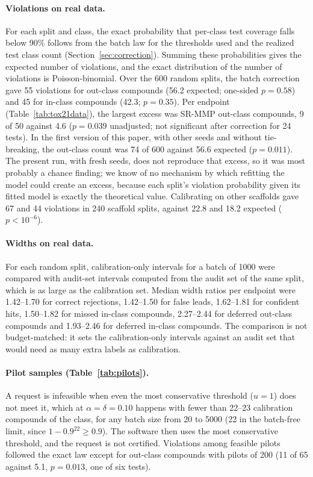 \documentclass[10pt]{article}
\begin{document}
\paragraph{Violations on real data.} For each split and class, the exact probability that per-class test coverage falls below 90\% follows from the batch law for the thresholds used and the realized test class count (Section~\ref{sec:correction}). Summing these probabilities gives the expected number of violations, and the exact distribution of the number of violations is Poisson-binomial. Over the 600 random splits, the batch correction gave 55 violations for out-class compounds (56.2 expected; one-sided $p=0.58$) and 45 for in-class compounds (42.3; $p=0.35$). Per endpoint (Table~\ref{tab:tox21data}), the largest excess was SR-MMP out-class compounds, 9 of 50 against 4.6 ($p=0.039$ unadjusted; not significant after correction for 24 tests). In the first version of this paper, with other seeds and without tie-breaking, the out-class count was 74 of 600 against 56.6 expected ($p=0.011$). The present run, with fresh seeds, does not reproduce that excess, so it was most probably a chance finding; we know of no mechanism by which refitting the model could create an excess, because each split's violation probability given its fitted model is exactly the theoretical value. Calibrating on other scaffolds gave 67 and 44 violations in 240 scaffold splits, against 22.8 and 18.2 expected ($p<10^{-6}$).

\paragraph{Widths on real data.} For each random split, calibration-only intervals for a batch of 1000 were compared with audit-set intervals computed from the audit set of the same split, which is as large as the calibration set. Median width ratios per endpoint were 1.42--1.70 for correct rejections, 1.42--1.50 for false leads, 1.62--1.81 for confident hits, 1.50--1.82 for missed in-class compounds, 2.27--2.44 for deferred out-class compounds and 1.93--2.46 for deferred in-class compounds. The comparison is not budget-matched: it sets the calibration-only intervals against an audit set that would need as many extra labels as calibration.

\paragraph{Pilot samples (Table~\ref{tab:pilots}).} A request is infeasible when even the most conservative threshold ($u=1$) does not meet it, which at $\alpha=\delta=0.10$ happens with fewer than 22--23 calibration compounds of the class, for any batch size from 20 to 5000 (22 in the batch-free limit, since $1-0.9^{22}\ge0.9$). The software then uses the most conservative threshold, and the request is not certified. Violations among feasible pilots followed the exact law except for out-class compounds with pilots of 200 (11 of 65 against 5.1, $p=0.013$, one of six tests).
\end{document}
